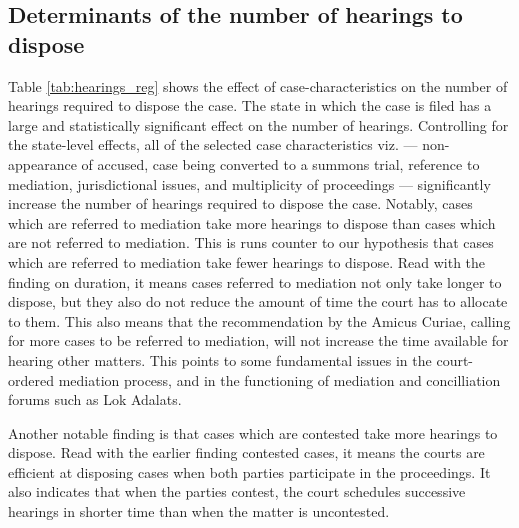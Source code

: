 \subsection{Determinants of the number of hearings to dispose}
\label{sec:determ-numb-hear}

Table \ref{tab:hearings_reg} shows the effect of case-characteristics on the number of hearings required to dispose the case. The state in which the case is filed has a large and statistically significant effect on the number of hearings. Controlling for the state-level effects, all of the selected case characteristics viz. --- non-appearance of accused, case being converted to a summons trial, reference to mediation, jurisdictional issues, and multiplicity of proceedings --- significantly increase the number of hearings required to dispose the case. Notably, cases which are referred to mediation take more hearings to dispose than cases which are not referred to mediation. This is runs counter to our hypothesis that cases which are referred to mediation take fewer hearings to dispose. Read with the finding on duration, it means cases referred to mediation not only take longer to dispose, but they also do not reduce the amount of time the court has to allocate to them. This also means that the recommendation by the Amicus Curiae, calling for more cases to be referred to mediation, will not increase the time available for hearing other matters. This points to some fundamental issues in the court-ordered mediation process, and in the functioning of mediation and concilliation forums such as Lok Adalats.

Another notable finding is that cases which are contested take more hearings to dispose. Read with the earlier finding contested cases, it means the courts are efficient at disposing cases when both parties participate in the proceedings. It also indicates that when the parties contest, the court schedules successive hearings in shorter time than when the matter is uncontested.

